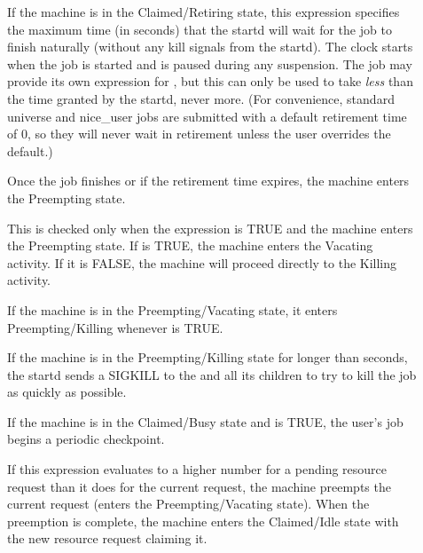 \begin{description}
\item[] If the machine is in the
Claimed/Retiring state, this expression specifies the maximum time (in
seconds) that the startd will wait for the job to finish naturally
(without any kill signals from the startd).  The clock starts when the
job is started and is paused during any suspension.  The job may
provide its own expression for , but this
can only be used to take \emph{less} than the time granted by the
startd, never more.  (For convenience, standard universe and
nice\_user jobs are submitted with a default retirement time of 0, so
they will never wait in retirement unless the user overrides the
default.)

Once the job finishes or if the retirement time expires, the machine
enters the Preempting state.
  
\item[] This is checked only when the
   expression is TRUE and the machine enters the
  Preempting state.
  If  is TRUE, the machine enters the Vacating
  activity.  
  If it is FALSE, the machine will proceed directly to the Killing
  activity.  
  
\item[] If the machine is in the Preempting/Vacating state, it
  enters Preempting/Killing whenever  is TRUE. 
  
\item[] If the machine is in the
  Preempting/Killing state for longer than 
  seconds, the startd sends a SIGKILL to the 
  and all its children to try to kill the job as quickly as possible.
  
\item[] If the machine is in the
  Claimed/Busy state and  is TRUE, the
  user's job begins a periodic checkpoint.
  
\item[] If this expression evaluates to a higher number for
  a pending resource request than it does for the current request, the
  machine preempts the current request (enters the
  Preempting/Vacating state).  When the preemption is complete, the
  machine enters the Claimed/Idle state with the new resource
  request claiming it.

\end{description}

